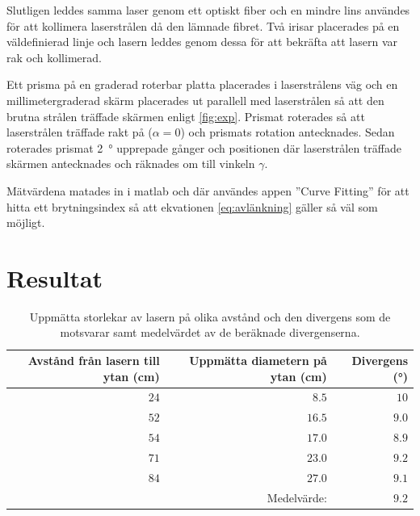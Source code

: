 \documentclass[a4paper]{article}
\begin{document}
Slutligen leddes samma laser genom ett optiskt fiber och en mindre lins användes för att kollimera laserstrålen då den lämnade fibret. Två irisar placerades på en väldefinierad linje och lasern leddes genom dessa för att bekräfta att lasern var rak och kollimerad.
  
  Ett prisma på en graderad roterbar platta placerades i laserstrålens väg och en millimetergraderad skärm placerades ut parallell med laserstrålen så att den brutna strålen träffade skärmen enligt \autoref{fig:exp}. Prismat roterades så att laserstrålen träffade rakt på ($\alpha=0$) och prismats rotation antecknades. Sedan roterades prismat \SI{2}{\degree} upprepade gånger och positionen där laserstrålen träffade skärmen antecknades och räknades om till vinkeln $\gamma$.
  
  Mätvärdena matades in i matlab och där användes appen ”Curve Fitting” för att hitta ett brytningsindex så att ekvationen \eqref{eq:avlänkning} gäller så väl som möjligt.

\section{Resultat}

\FloatBarrier

\begin{table}[h]
	\centering
	\caption{Uppmätta storlekar av lasern på olika avstånd och den divergens som de motsvarar samt medelvärdet av de beräknade divergenserna.}
	\label{tab:div}
	\begin{tabular}{|rrr|}%
		\hline
		Avstånd från lasern till ytan (\si{\centi\meter}) & Uppmätta diametern på ytan (\si{\centi\meter}) & Divergens (\si{\degree}) \\
		\hline
		$24$ & $8.5$ & $10$ \\
		$52$ & $16.5$ & $9.0$ \\
		$54$ & $17.0$ & $8.9$ \\
		$71$ & $23.0$ & $9.2$ \\
		$84$ & $27.0$ & $9.1$ \\\hline
		& Medelvärde: & $9.2$ \\\hline
	\end{tabular}
\end{table}
\end{document}
